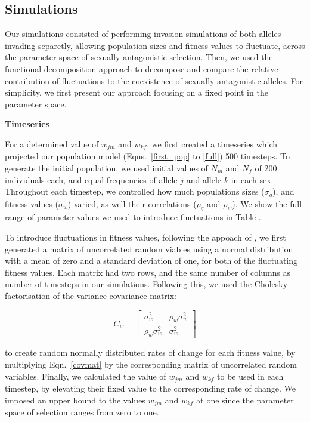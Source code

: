 \documentclass[]{article}
\begin{document}
\subsection*{Simulations}

Our simulations consisted of performing  invasion simulations of both alleles invading separetly, allowing population sizes and fitness values to fluctuate, across the parameter space of sexually antagonistic selection. Then, we used the functional decomposition approach to decompose and compare the relative contribution of fluctuations to the coexistence of sexually antagonistic alleles. For simplicity, we first present our approach focusing on a fixed point in the parameter space.

\vspace{5mm}
\noindent\textbf{Timeseries}

For a determined value of $w_{jm}$ and $w_{kf}$, we first created a timeseries which projected our population model (Eqns.~\ref{first_pop} to \ref{full}) 500 timesteps. To generate the initial population, we used initial values of $N_{m}$ and $N_{f}$  of 200 individuals each, and equal frequencies of allele $j$ and allele $k$ in each sex. Throughout each timestep, we controlled how much populations sizes ($\sigma_{g}$), and fitness values ($\sigma_{w}$) varied, as well their correlations ($\rho_{g}$ and $\rho_{w}$). We show the full range of parameter values we used to introduce fluctuations in Table .

To introduce fluctuations in fitness values, following the appoach of  \citet{shoemaker2020}, we first generated a matrix of uncorrelated random viables using a normal distribution with a mean of zero and a standard deviation of one, for both of the fluctuating fitness values. Each matrix had two rows, and the same number of columns as number of timesteps in our simulations. Following this, we used the Cholesky factorisation of the variance-covariance matrix:


\begin{equation}
C_{w} = \begin{bmatrix}
\sigma_{w}^{2} & \rho_{w} \sigma_{w}^{2} \\
\rho_{w} \sigma_{w}^{2} & \sigma_{w}^{2}
\end{bmatrix}
\label{covmat}
\end{equation}

to create random normally distributed  rates of change for each fitness value, by multiplying Eqn.~\ref{covmat} by the corresponding matrix of uncorrelated random variables. Finally, we calculated the value of $w_{jm}$ and $w_{kf}$ to be used in each timestep, by elevating their fixed value to the corresponding rate of change. We imposed an upper bound to the values $w_{jm}$ and $w_{kf}$ at one since the parameter space of selection ranges from zero to one.
\end{document}
